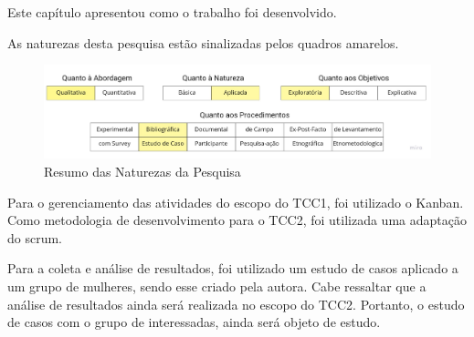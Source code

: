 Este capítulo apresentou como o trabalho foi desenvolvido.

As naturezas desta pesquisa estão sinalizadas pelos quadros amarelos.

\begin{figure}[ht]
	\centering
	\includegraphics[keepaspectratio=true,scale=0.3]{figuras/resumoAbordagem.pdf}
	\caption{Resumo das Naturezas da Pesquisa}
        \label{fig06}
\end{figure}

Para o gerenciamento das atividades do escopo do TCC1, foi utilizado o Kanban. Como metodologia de desenvolvimento para o TCC2, foi utilizada uma adaptação do scrum.

Para a coleta e análise de resultados, foi utilizado um estudo 
de casos aplicado a um grupo de mulheres, sendo esse criado pela 
autora. Cabe ressaltar que a análise de resultados ainda será 
realizada no escopo do TCC2. Portanto, o estudo de casos com o 
grupo de interessadas, ainda será objeto de estudo.



